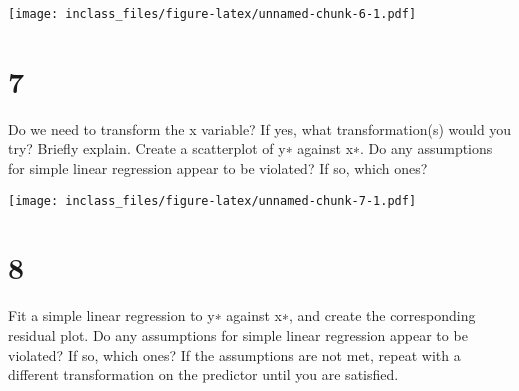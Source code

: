 \documentclass[]{article}
\newenvironment{Shaded}{\begin{snugshade}}{\end{snugshade}}
\newcommand{\KeywordTok}[1]{\textcolor[rgb]{0.13,0.29,0.53}{\textbf{#1}}}
\newcommand{\DataTypeTok}[1]{\textcolor[rgb]{0.13,0.29,0.53}{#1}}
\newcommand{\DecValTok}[1]{\textcolor[rgb]{0.00,0.00,0.81}{#1}}
\newcommand{\FloatTok}[1]{\textcolor[rgb]{0.00,0.00,0.81}{#1}}
\newcommand{\StringTok}[1]{\textcolor[rgb]{0.31,0.60,0.02}{#1}}
\newcommand{\OperatorTok}[1]{\textcolor[rgb]{0.81,0.36,0.00}{\textbf{#1}}}
\newcommand{\NormalTok}[1]{#1}
\begin{document}
\texttt{[image: inclass\_files/figure-latex/unnamed-chunk-6-1.pdf]}

\section{7}\label{section-4}

Do we need to transform the x variable? If yes, what transformation(s)
would you try? Briefly explain. Create a scatterplot of y∗ against x∗.
Do any assumptions for simple linear regression appear to be violated?
If so, which ones?

\begin{Shaded}
\end{Shaded}

\texttt{[image: inclass\_files/figure-latex/unnamed-chunk-7-1.pdf]}

\section{8}\label{section-5}

Fit a simple linear regression to y∗ against x∗, and create the
corresponding residual plot. Do any assumptions for simple linear
regression appear to be violated? If so, which ones? If the assumptions
are not met, repeat with a different transformation on the predictor
until you are satisfied.

\begin{Shaded}
\end{Shaded}
\end{document}
